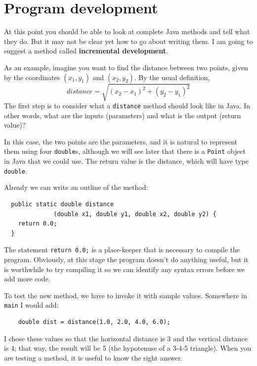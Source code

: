 \section{Program development}
\label{distance}

At this point you should be able to look at complete Java methods and
tell what they do.  But it may not be clear yet how to go about
writing them.  I am going to suggest a method called {\bf incremental
  development}.

As an example, imagine you want to find the distance between
two points, given by the coordinates $(x_1, y_1)$ and
$(x_2, y_2)$.  By the usual definition,
%
\begin{equation*}
distance = \sqrt{(x_2 - x_1)^2 +(y_2 - y_1)^2}
\end{equation*}
%
The first step is to consider what a {\tt distance} method
should look like in Java.  In other words, what are the inputs
(parameters) and what is the output (return value)?

In this case, the two points are the parameters, and it is
natural to represent them using four {\tt double}s, although
we will see later that there is a {\tt Point} object in Java
that we could use.  The return value is the distance, which
will have type {\tt double}.

Already we can write an outline of the method:

\begin{lstlisting}
  public static double distance
              (double x1, double y1, double x2, double y2) {
    return 0.0;
  }
\end{lstlisting}
%
The statement {\tt return 0.0;} is a place-keeper that is necessary
to compile the program.  Obviously, at this stage the
program doesn't do anything useful, but it is worthwhile to
try compiling it so we can identify any syntax errors before
we add more code.

To test the new method, we have to invoke it with
sample values.  Somewhere in {\tt main} I would add:

\begin{lstlisting}
    double dist = distance(1.0, 2.0, 4.0, 6.0);
\end{lstlisting}
%
I chose these values so that the horizontal
distance is 3 and the vertical distance is 4; that way,
the result will be 5 (the hypotenuse of a 3-4-5 triangle).
When you are testing a method, it is useful to know the right
answer.

